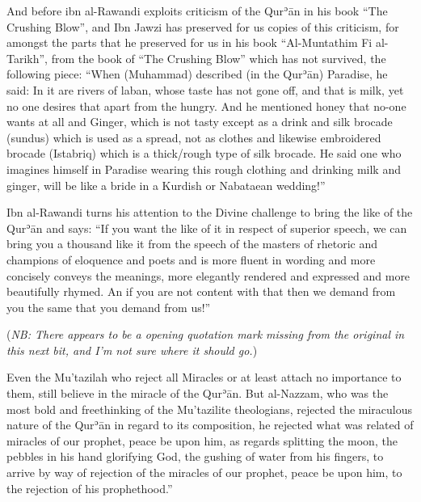 \documentclass[12pt]{book}
\def \Quran{Qurʾān} %
\def \Qrn{\Quran}   %
\newcommand{\NB}[1]{\emph{NB: #1}}
\begin{document}

And before ibn al-Rawandi exploits criticism of the \Qrn{} in his book “The
Crushing Blow”, and Ibn Jawzi has preserved for us copies of this criticism,
for amongst the parts that he preserved for us in his book “Al-Muntathim Fi
al-Tarikh”, from the book of “The Crushing Blow” which has not survived, the
following piece: “When (Muhammad) described (in the \Quran) Paradise, he said:
In it are rivers of laban, whose taste has not gone off, and that is milk, yet
no one desires that apart from the hungry. And he mentioned honey that no-one
wants at all and Ginger, which is not tasty except as a drink and silk brocade
(sundus) which is used as a spread, not as clothes and likewise embroidered
brocade (Istabriq) which is a thick/rough type of silk brocade. He said one who
imagines himself in Paradise wearing this rough clothing and drinking milk and
ginger, will be like a bride in a Kurdish or Nabataean wedding!”\footnotemark


Ibn al-Rawandi turns his attention to the Divine challenge to bring the like of
the \Qrn{} and says: “If you want the like of it in respect of superior speech,
we can bring you a thousand like it from the speech of the masters of rhetoric
and champions of eloquence and poets and is more fluent in wording and more
concisely conveys the meanings, more elegantly rendered and expressed and more
beautifully rhymed. An if you are not content with that then we demand from you
the same that you demand from us!”\footnotemark


(\NB{There appears to be a opening quotation mark missing from the original in
this next bit, and I’m not sure where it should go.})

Even the Mu’tazilah who reject all Miracles or at least attach no importance to
them, still believe in the miracle of the \Quran.\footnotemark
{}
But al-Nazzam, who was the most bold and freethinking of the Mu’tazilite
theologians, rejected the miraculous nature of the \Qrn{} in regard to its
composition, he rejected what was related of miracles of our prophet, peace be
upon him, as regards splitting the moon, the pebbles in his hand glorifying
God, the gushing of water from his fingers, to arrive by way of rejection of
the miracles of our prophet, peace be upon him, to the rejection of his
prophethood.”\footnotemark
\end{document}
